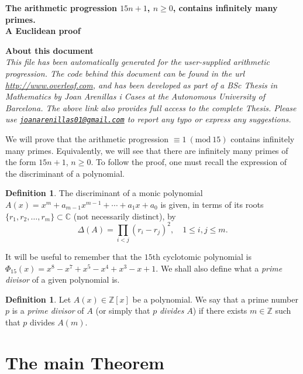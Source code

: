 \documentclass[a4paper, 12pt]{article}
\theoremstyle{definition}
\newtheorem{definition}[theorem]{Definition}
\newcommand{\Z}{\ensuremath{\mathbb{Z}}}
\newcommand{\C}{\ensuremath{\mathbb{C}}}
\newcommand{\Mod}[1]{\ (\mathrm{mod}\ #1)} %
\renewcommand\title{\textbf{The arithmetic progression $15n+1$, $n\geqslant0$, contains infinitely many primes.\\ A Euclidean proof}}
\begin{document}
\thispagestyle{plain}
\sloppy
\begin{center}
{\huge \bfseries \title\par}
\vspace{1cm}
\end{center}

\begin{mybox}
{\Large \textbf{About this document}}
\vspace{0.3cm}\\
\textit{This file has been automatically generated for the user-supplied arithmetic progression. The code behind this document can be found in the url \url{http://www.overleaf.com}, and has been developed as part of a BSc Thesis in Mathematics by Joan Arenillas i Cases at the Autonomous University of Barcelona. The above link also provides full access to the complete Thesis. Please use \href{mailto:joanarenillas01@gmail.com}{\nolinkurl{joanarenillas01@gmail.com}} to report any typo or express any suggestions.}
\end{mybox}
\vspace{0.5cm}

We will prove that the arithmetic progression $\equiv 1 \Mod{15}$ contains infinitely many primes. Equivalently, we will see that there are infinitely many primes of the form $15n+1$, $n\geqslant0$. To follow the proof, one must recall the expression of the discriminant of a polynomial. 
\begin{definition}
The discriminant of a monic polynomial $A(x)=x^m+a_{m-1}x^{m-1}+\cdots+a_1x+a_0$ is given, in terms of its roots $\{r_1,r_2,\dots,r_m\}\subset\C$ (not necessarily distinct), by
\begin{equation}\label{eq:discrim}
	\Delta(A)=\prod_{i<j}(r_i-r_j)^2, \quad 1\leqslant i,j\leqslant m.
\end{equation}
\end{definition}
It will be useful to remember that the $15$th cyclotomic polynomial is $\Phi_{15}(x)=x^{8} - x^{7} + x^{5} - x^{4} + x^{3} - x + 1$. We shall also define what a \emph{prime divisor} of a given polynomial is.
\begin{definition}
Let $A(x)\in\Z[x]$ be a polynomial. We say that a prime number $p$ is a \emph{prime divisor} of $A$ (or simply that $p$ \emph{divides} $A$) if there exists $m\in\Z$ such that $p$ divides $A(m)$.
\end{definition}

\section{The main Theorem}\label{sec:mainTh}
\end{document}
